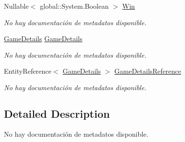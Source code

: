 \begin{DoxyCompactItemize}
Nullable$<$ global\-::\-System.\-Boolean $>$ \hyperlink{class_game_memory_1_1_game_detail_interactions_aa3afd285fef25ceaf38fe36e2bfb0f6b}{Win}
\begin{DoxyCompactList}\small\item\em No hay documentación de metadatos disponible. \end{DoxyCompactList}\item 
\hyperlink{class_game_memory_1_1_game_details}{Game\-Details} \hyperlink{class_game_memory_1_1_game_detail_interactions_ac8ae8dbae74af6bdd6c172b0d0b0acf5}{Game\-Details}
\begin{DoxyCompactList}\small\item\em No hay documentación de metadatos disponible. \end{DoxyCompactList}\item 
Entity\-Reference$<$ \hyperlink{class_game_memory_1_1_game_details}{Game\-Details} $>$ \hyperlink{class_game_memory_1_1_game_detail_interactions_a33a1137aaeec41b55d19507225ed303f}{Game\-Details\-Reference}
\begin{DoxyCompactList}\small\item\em No hay documentación de metadatos disponible. \end{DoxyCompactList}\end{DoxyCompactItemize}


\subsection{Detailed Description}
No hay documentación de metadatos disponible. 



